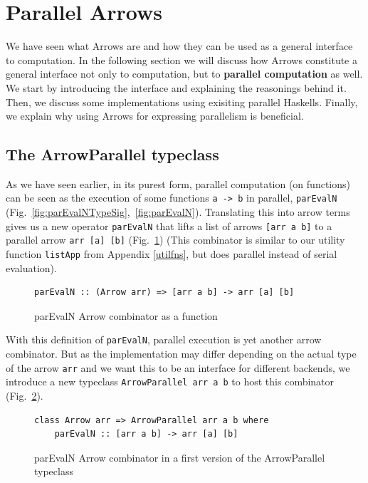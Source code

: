 \documentclass{jfp1}
\newcommand{\inlinecode}[1]{\texttt{#1}}
\begin{document}
	\section{Parallel Arrows}
\label{sec:parallel-arrows}
We have seen what Arrows are and how they can be used as a general interface to computation. In the following section we will discuss how Arrows constitute a general interface not only to computation, but to \textbf{parallel computation} as well. We start by introducing the interface and explaining the reasonings behind it. Then, we discuss some implementations using exisiting parallel Haskells. Finally, we explain why using Arrows for expressing parallelism is beneficial.
\subsection{The ArrowParallel typeclass}
As we have seen earlier, in its purest form, parallel computation (on functions) can be seen as the execution of some functions \inlinecode{a -> b} in parallel, \inlinecode{parEvalN} (Fig.~\ref{fig:parEvalNTypeSig},~\ref{fig:parEvalN}).
Translating this into arrow terms gives us a new operator \inlinecode{parEvalN} that lifts a list of arrows \inlinecode{[arr a b]} to a parallel arrow \inlinecode{arr [a] [b]} (Fig.~\ref{fig:parEvalNArrowFn}) (This combinator is similar to our utility function \lstinline{listApp} from Appendix \ref{utilfns}, but does parallel instead of serial evaluation).
\begin{figure}[h]
\begin{lstlisting}[frame=htrbl]
parEvalN :: (Arrow arr) => [arr a b] -> arr [a] [b]
\end{lstlisting}
\caption{parEvalN Arrow combinator as a function}
\label{fig:parEvalNArrowFn}
\end{figure}
With this definition of \inlinecode{parEvalN}, parallel execution is yet another arrow combinator. But as the implementation may differ depending on the actual type of the arrow \inlinecode{arr} and we want this to be an interface for different backends, we introduce a new typeclass \inlinecode{ArrowParallel arr a b} to host this combinator (Fig.~\ref{fig:parEvalNArrowTypeClass1}).
\begin{figure}[h]
\begin{lstlisting}[frame=htrbl]
class Arrow arr => ArrowParallel arr a b where
	parEvalN :: [arr a b] -> arr [a] [b]
\end{lstlisting}
\caption{parEvalN Arrow combinator in a first version of the ArrowParallel typeclass}
\label{fig:parEvalNArrowTypeClass1}
\end{figure}
\end{document}
